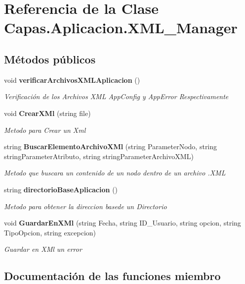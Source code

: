 \section{Referencia de la Clase Capas.\+Aplicacion.\+X\+M\+L\+\_\+\+Manager}
\label{class_capas_1_1_aplicacion_1_1_x_m_l___manager}
\subsection*{Métodos públicos}
\begin{DoxyCompactItemize}
\item 
void {\bf verificar\+Archivos\+X\+M\+L\+Aplicacion} ()
\begin{DoxyCompactList}\small\item\em Verificación de los Archivos X\+ML App\+Config y App\+Error Respectivamente \end{DoxyCompactList}\item 
void {\bf Crear\+X\+Ml} (string file)
\begin{DoxyCompactList}\small\item\em Metodo para Crear un Xml \end{DoxyCompactList}\item 
string {\bf Buscar\+Elemento\+Archivo\+X\+Ml} (string Parameter\+Nodo, string string\+Parameter\+Atributo, string string\+Parameter\+Archivo\+X\+ML)
\begin{DoxyCompactList}\small\item\em Metodo que buscara un contenido de un nodo dentro de un archivo .X\+ML \end{DoxyCompactList}\item 
string {\bf directorio\+Base\+Aplicacion} ()
\begin{DoxyCompactList}\small\item\em Metodo para obtener la direccion basede un Directorio \end{DoxyCompactList}\item 
void {\bf Guardar\+En\+X\+Ml} (string Fecha, string I\+D\+\_\+\+Usuario, string opcion, string Tipo\+Opcion, string excepcion)
\begin{DoxyCompactList}\small\item\em Guardar en X\+Ml un error \end{DoxyCompactList}\end{DoxyCompactItemize}


\subsection{Documentación de las funciones miembro}
